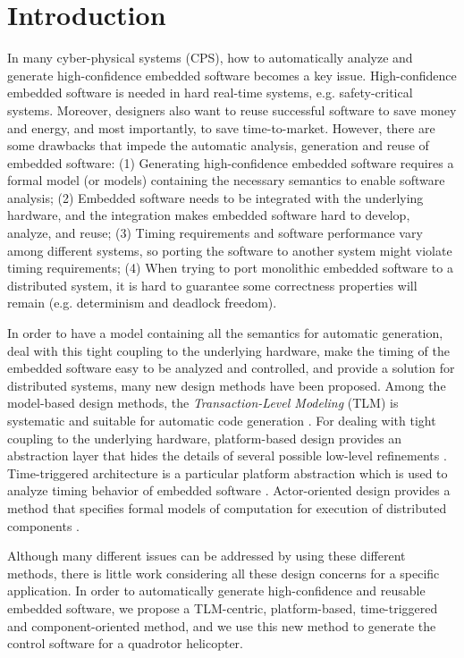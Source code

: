 \documentclass{acm_proc_article-sp}
\begin{document}
\section{Introduction}
In many cyber-physical systems (CPS), how to automatically analyze and generate high-confidence embedded software becomes a key issue. High-confidence embedded software is needed in hard real-time systems, e.g. safety-critical systems. Moreover, designers also want to reuse successful software to save money and energy, and most importantly, to save time-to-market. However, there are some drawbacks that impede the automatic analysis, generation and reuse of embedded software: (1) Generating high-confidence embedded software requires a formal model (or models) containing the necessary semantics to enable software analysis; (2) Embedded software needs to be integrated with the underlying hardware, and the integration makes embedded software hard to develop, analyze, and reuse; (3) Timing requirements and software performance vary among different systems, so porting the software to another system might violate timing requirements; (4) When trying to port monolithic embedded software to a distributed system, it is hard to guarantee some correctness properties will remain (e.g. determinism and deadlock freedom).

In order to have a model containing all the semantics for automatic generation, deal with this tight coupling to the underlying hardware, make the timing of the embedded software easy to be analyzed and controlled, and provide a solution for distributed systems, many new design methods have been proposed. Among the model-based design methods, the \emph{Transaction-Level Modeling} (TLM) is systematic and suitable for automatic code generation \cite{modeling:embedded}\cite{modeling:tlm}. For dealing with tight coupling to the underlying hardware, platform-based design provides an abstraction layer that hides the details of several possible low-level refinements \cite{modeling:platform}. Time-triggered architecture is a particular platform abstraction which is used to analyze timing behavior of embedded software \cite{modeling:giotto3}. Actor-oriented design provides a method that specifies formal models of computation for execution of distributed components \cite{embedded:software}.

Although many different issues can be addressed by using these different methods, there is little work considering all these design concerns for a specific application. In order to automatically generate high-confidence and reusable embedded software, we propose a TLM-centric, platform-based, time-triggered and component-oriented method, and we use this new method to generate the control software for a quadrotor helicopter.
\end{document}
